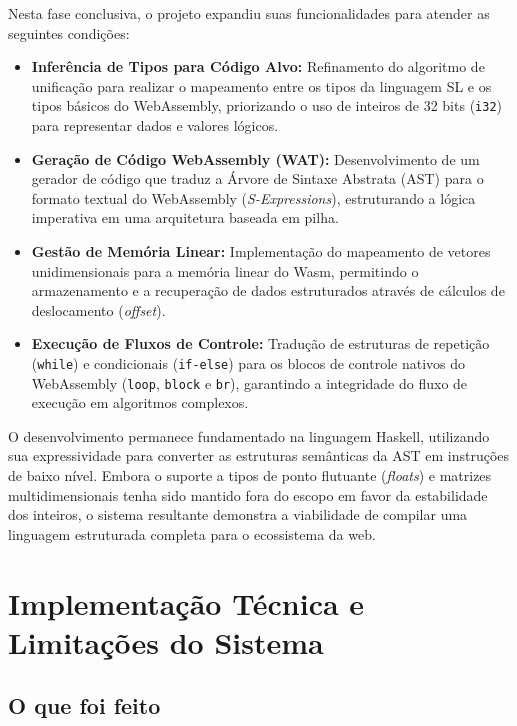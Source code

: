 \documentclass[12pt,a4paper]{article}
\begin{document}
Nesta fase conclusiva, o projeto expandiu suas funcionalidades para atender as seguintes condições:
\begin{itemize}
    \item \textbf{Inferência de Tipos para Código Alvo:} Refinamento do algoritmo de unificação para realizar o mapeamento entre os tipos da linguagem SL e os tipos básicos do WebAssembly, priorizando o uso de inteiros de 32 bits (\texttt{i32}) para representar dados e valores lógicos.
    \item \textbf{Geração de Código WebAssembly (WAT):} Desenvolvimento de um gerador de código que traduz a Árvore de Sintaxe Abstrata (AST) para o formato textual do WebAssembly (\textit{S-Expressions}), estruturando a lógica imperativa em uma arquitetura baseada em pilha.
    \item \textbf{Gestão de Memória Linear:} Implementação do mapeamento de vetores unidimensionais para a memória linear do Wasm, permitindo o armazenamento e a recuperação de dados estruturados através de cálculos de deslocamento (\textit{offset}).
    \item \textbf{Execução de Fluxos de Controle:} Tradução de estruturas de repetição (\texttt{while}) e condicionais (\texttt{if-else}) para os blocos de controle nativos do WebAssembly (\texttt{loop}, \texttt{block} e \texttt{br}), garantindo a integridade do fluxo de execução em algoritmos complexos.
\end{itemize}

O desenvolvimento permanece fundamentado na linguagem Haskell, utilizando sua expressividade para converter as estruturas semânticas da AST em instruções de baixo nível. Embora o suporte a tipos de ponto flutuante (\textit{floats}) e matrizes multidimensionais tenha sido mantido fora do escopo em favor da estabilidade dos inteiros, o sistema resultante demonstra a viabilidade de compilar uma linguagem estruturada completa para o ecossistema da web.

\section{Implementação Técnica e Limitações do Sistema}

\subsection{O que foi feito}
\end{document}
